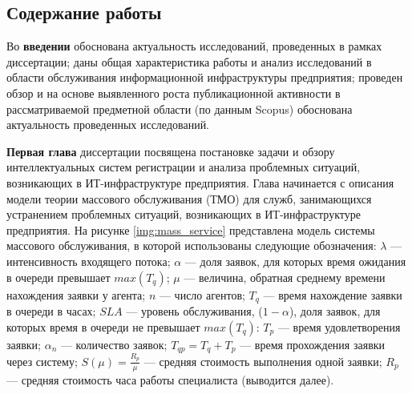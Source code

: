 \newcommand{\actuality}{\underline{\textbf{Актуальность темы.}}}
\newcommand{\aim}{{\textbf{Целью}}}
\newcommand{\tasks}{{\textbf{задачи}}}
\newcommand{\scope}{{\textbf{Область исследования}}}
\newcommand{\subject}{{\textbf{Предметом исследования}}}
\newcommand{\methods}{{\textbf{Методы исследования}}}
\newcommand{\defpositions}{{\textbf{Основные положения, выносимые на~защиту:}}}
\newcommand{\novelty}{{\textbf{Научная новизна}}}
\newcommand{\influence}{{\textbf{Практическая значимость.}}}
\newcommand{\reliability}{{\textbf{Достоверность}}}
\newcommand{\probation}{{\textbf{Апробация работы.}}}
\newcommand{\contribution}{{\textbf{Личный вклад.}}}
\newcommand{\publications}{{\textbf{Публикации.}}}




\subsection*{Содержание работы}
Во \textbf{введении} обоснована актуальность исследований, проведенных в рамках диссертации; даны общая характеристика работы и анализ исследований в области обслуживания информационной инфраструктуры предприятия; проведен обзор и на основе выявленного роста публикационной активности в рассматриваемой предметной области (по данным Scopus) обоснована актуальность проведенных исследований. \par

\textbf{Первая глава} диссертации посвящена постановке задачи и обзору интеллектуальных систем регистрации и анализа проблемных ситуаций, возникающих в ИТ-инфраструктуре предприятия.
Глава начинается с описания модели теории массового обслуживания (ТМО) для служб, занимающихся устранением проблемных ситуаций, возникающих в ИТ-инфраструктуре предприятия. На рисунке \ref{img:mass_service} представлена модель системы массового обслуживания, в которой использованы следующие обозначения: $\lambda$ --- интенсивность входящего потока;  $\alpha$ --- доля заявок, для которых время ожидания в очереди превышает $max(T_q)$;       
$\mu$ --- величина, обратная среднему времени нахождения заявки у агента;
$n$ --- число агентов;
$T_q$ --- время нахождение заявки в очереди в часах;
$SLA$ --- уровень обслуживания, ($1-\alpha$), доля заявок, для которых время в очереди не превышает $max(T_q)$: $T_p$ --- время удовлетворения заявки;
 $\alpha_n$ --- количество заявок;
 $T_{qp}=T_q+T_p$ --- время прохождения заявки через систему;
 $S(\mu)= \frac{R_p}{\mu} $ --- средняя стоимость выполнения одной заявки;
 $R_p$ --- средняя стоимость часа работы специалиста (выводится далее).


